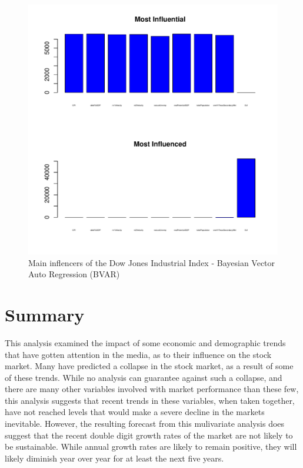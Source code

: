 \documentclass[12pt]{article}         %
\begin{document}
\begin{figure}[h!]
\begin{center}
\includegraphics[width=\linewidth]{plots/DJI_barchart_not_whitened_yrly.pdf}
\caption{Main inflencers of the Dow Jones Industrial Index - Bayesian Vector Auto Regression (BVAR)}
\label{fig:BVARInfluencers}
\end{center}
\end{figure}

\section{Summary}

This analysis examined the impact of some economic and demographic trends that have gotten attention in the media, as to their influence on the stock market.  Many have predicted a collapse in the stock market, as a result of some of these trends.  While no analysis can guarantee against such a collapse, and there are many other variables involved with market performance than these few, this analysis suggests that recent trends in these variables, when taken together, have not reached levels that would make a severe decline in the markets inevitable.  However, the resulting forecast from this mulivariate analysis does suggest that the recent double digit growth rates of the market are not likely to be sustainable.  While annual growth rates are likely to remain positive, they will likely diminish year over year for at least the next five years.
\end{document}

